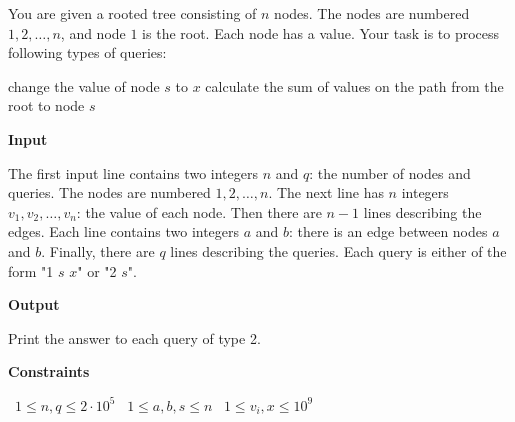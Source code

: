 You are given a rooted tree consisting of $n$ nodes. The nodes are numbered $1,2,\ldots,n$, and node $1$ is the root. Each node has a value.
Your task is to process following types of queries:

change the value of node $s$ to $x$
calculate the sum of values on the path from the root to node $s$

\vspace{0.3cm}\noindent\textbf{Input}

The first input line contains two integers $n$ and $q$: the number of nodes and queries. The nodes are numbered $1,2,\ldots,n$.
The next line has $n$ integers $v_1,v_2,\ldots,v_n$: the value of each node.
Then there are $n-1$ lines describing the edges. Each line contains two integers $a$ and $b$: there is an edge between nodes $a$ and $b$.
Finally, there are $q$ lines describing the queries. Each query is either of the form "1 $s$ $x$" or "2 $s$".

\vspace{0.3cm}\noindent\textbf{Output}

Print the answer to each query of type 2.

\vspace{0.3cm}\noindent\textbf{Constraints}

\textbullet\ $1 \le n, q \le 2 \cdot 10^5$
\textbullet\ $1 \le a,b, s \le n$
\textbullet\ $1 \le v_i, x \le 10^9$